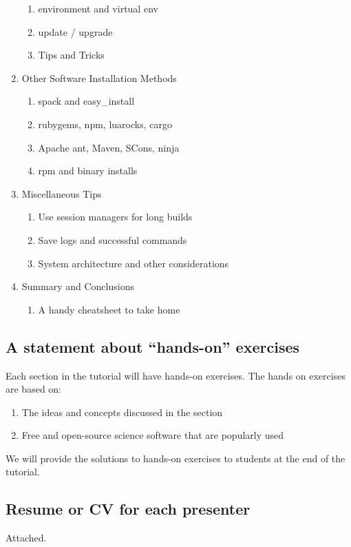 \documentclass{report}
\begin{document}
\begin{enumerate}
\begin{enumerate}
    \item environment and virtual env
    \item update / upgrade
    \item Tips and Tricks
  \end{enumerate}
\item Other Software Installation Methods
    \begin{enumerate}
        \item spack and easy\_install
        \item rubygems, npm, luarocks, cargo
        \item Apache ant, Maven, SCons, ninja 
        \item rpm and binary installs
    \end{enumerate}
\item Miscellaneous Tips
  \begin{enumerate}
    \item Use session managers for long builds
    \item Save logs and successful commands
    \item System architecture and other considerations
  \end{enumerate}
\item Summary and Conclusions
  \begin{enumerate}
    \item A handy cheatsheet to take home
  \end{enumerate}
\end{enumerate}

\subsection*{A statement about ``hands-on'' exercises}
Each section in the tutorial will have hands-on exercises. The hands on exercises are based on:
\begin{enumerate}
\item The ideas and concepts discussed in the section 
\item Free and open-source science software that are popularly used
\end{enumerate}
We will provide the solutions to hands-on exercises to students at the end of the tutorial.

\subsection*{Resume or CV for each presenter}
Attached.
\end{document}
